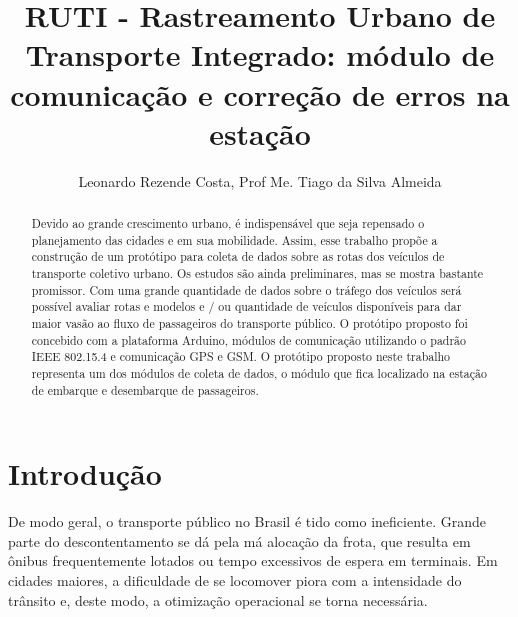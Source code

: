 \documentclass[12pt]{uftpibicsic2018}
\title{RUTI - Rastreamento Urbano de Transporte Integrado: módulo de comunicação e correção de erros na estação}
\author{Leonardo Rezende Costa\inst{1}, Prof Me. Tiago da Silva Almeida\inst{2}}
\begin{document}
\maketitle

\begin{abstract}
Devido ao grande crescimento urbano, é indispensável que seja repensado o planejamento das cidades e em sua mobilidade. Assim, esse trabalho propõe a construção de um protótipo para coleta de dados sobre as rotas dos veículos de transporte coletivo urbano. Os estudos são ainda preliminares, mas se mostra bastante promissor. Com uma grande quantidade de dados sobre o tráfego dos veículos será possível avaliar rotas e modelos e / ou quantidade de veículos disponíveis para dar maior vasão ao fluxo de passageiros do transporte público. O protótipo proposto foi concebido com a plataforma Arduino, módulos de comunicação utilizando o padrão IEEE 802.15.4 e comunicação GPS e GSM. O protótipo proposto neste trabalho representa um dos módulos de coleta de dados, o módulo que fica localizado na estação de embarque e desembarque de passageiros.
\end{abstract}

\chapter{Introdução}\vskip -12pt

%

De modo geral, o transporte público no Brasil é tido como ineficiente. Grande parte do descontentamento se dá pela má alocação da frota, que resulta em ônibus frequentemente lotados ou tempo excessivos de espera em terminais. Em cidades maiores, a dificuldade de se locomover piora com a intensidade do trânsito e, deste modo, a otimização operacional se torna necessária.
\end{document}
